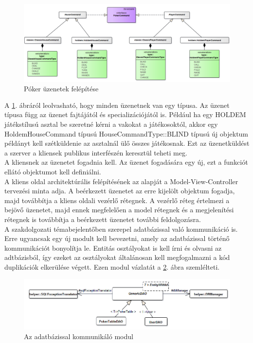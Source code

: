 \begin{figure}[h!]
	\caption{Póker üzenetek felépítése}
	\label{fig:messaging}
	\centering
	\includegraphics[width=\linewidth]{developer-documentation/images/messaging.png}
\end{figure}
A \ref{fig:messaging}. ábráról leolvasható, hogy minden üzenetnek van egy típusa. Az üzenet típusa függ az üzenet fajtájától és specializációjától is. Például ha egy HOLDEM játékstílusú asztal be szeretné kérni a vakokat a játékosoktól, akkor egy HoldemHouseCommand típusú HouseCommandType::BLIND típusú új objektum példányt kell szétküldenie az asztalnál ülő összes játékosnak. Ezt az üzenetküldést a szerver a kliensek publikus interfészén keresztül teheti meg. \\
A kliensnek az üzenetet fogadnia kell. Az üzenet fogadására egy új, ezt a funkciót ellátó objektumot kell definiálni. \\
A kliens oldal architektúrális felépítésének az alapját a Model-View-Controller tervezési minta adja. A beérkezett üzenetet az erre kijelölt objektum fogadja, majd továbbítja a kliens oldali vezérlő rétegnek. A vezérlő réteg értelmezi a bejövő üzenetet, majd ennek megfelelően a model rétegnek és a megjelenítési rétegnek is továbbítja a beérkezett üzenetet további feldolgozásra. \\
A szakdolgozati témabejelentőben szerepel adatbázissal való kommunikáció is. Erre ugyancsak egy új modult kell bevezetni, amely az adatbázissal történő kommunikációt bonyolítja le. Entitás osztályokat is kell írni és olvasni az adtbázisból, így ezeket az osztályokat általánosan kell megfogalmazni a kód duplikációk elkerülése végett. Ezen modul vázlatát a \ref{fig:persist}. ábra szemlélteti. \\
\begin{figure}[h!]
	\caption{Az adatbázissal kommunikáló modul}
	\label{fig:persist}
	\centering
	\includegraphics[width=\linewidth]{developer-documentation/images/dao.png}
\end{figure}
